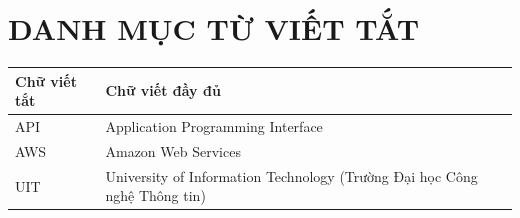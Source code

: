 \chapter*{DANH MỤC TỪ VIẾT TẮT}

\begin{table}[h]
    \centering
    \begin{tabularx}{\textwidth}{l X}
    \toprule
    \textbf{Chữ viết tắt} & \textbf{Chữ viết đầy đủ} \\
    \midrule
    API & Application Programming Interface \\
    AWS & Amazon Web Services \\
    UIT & University of Information Technology (Trường Đại học Công nghệ Thông tin) \\
    \bottomrule
    \end{tabularx}
\end{table}
